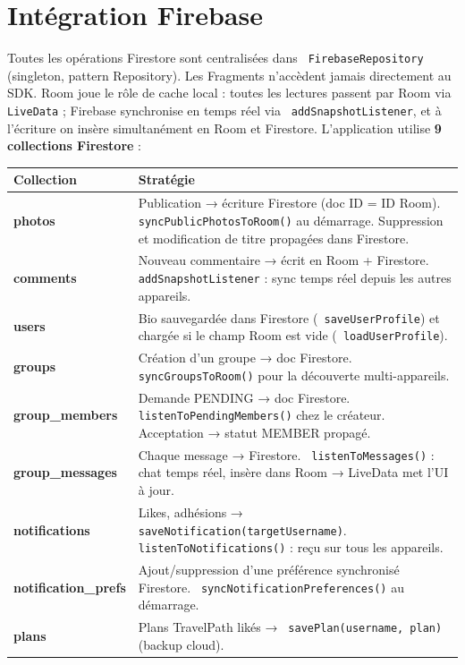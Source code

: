 \documentclass[a4paper,12pt,openany]{report}
\newcommand{\ic}[1]{\texttt{\small\colorbox{lightbg}{\color{navy!90} #1}}}
\begin{document}
\section{Intégration Firebase}

Toutes les opérations Firestore sont centralisées dans \ic{FirebaseRepository}
(singleton, pattern Repository). Les Fragments n'accèdent jamais directement
au SDK. Room joue le rôle de cache local : toutes les lectures passent par
Room via \ic{LiveData} ; Firebase synchronise en temps réel via
\ic{addSnapshotListener}, et à l'écriture on insère simultanément en Room
et Firestore. L'application utilise \textbf{9 collections Firestore} :

\begin{tabularx}{\textwidth}{>{\bfseries\ttfamily\small}l X}
  \toprule
  Collection & Stratégie \\
  \midrule
  photos           & Publication → écriture Firestore (doc ID = ID Room).
                     \ic{syncPublicPhotosToRoom()} au démarrage. Suppression et
                     modification de titre propagées dans Firestore. \\
  comments         & Nouveau commentaire → écrit en Room + Firestore.
                     \ic{addSnapshotListener} : sync temps réel depuis les autres appareils. \\
  users            & Bio sauvegardée dans Firestore (\ic{saveUserProfile}) et chargée
                     si le champ Room est vide (\ic{loadUserProfile}). \\
  groups           & Création d'un groupe → doc Firestore. \ic{syncGroupsToRoom()}
                     pour la découverte multi-appareils. \\
  group\_members   & Demande PENDING → doc Firestore. \ic{listenToPendingMembers()}
                     chez le créateur. Acceptation → statut MEMBER propagé. \\
  group\_messages  & Chaque message → Firestore. \ic{listenToMessages()} : chat
                     temps réel, insère dans Room → LiveData met l'UI à jour. \\
  notifications    & Likes, adhésions → \ic{saveNotification(targetUsername)}.
                     \ic{listenToNotifications()} : reçu sur tous les appareils. \\
  notification\_prefs & Ajout/suppression d'une préférence synchronisé Firestore.
                     \ic{syncNotificationPreferences()} au démarrage. \\
  plans            & Plans TravelPath likés → \ic{savePlan(username, plan)}
                     (backup cloud). \\
  \bottomrule
\end{tabularx}
\end{document}
